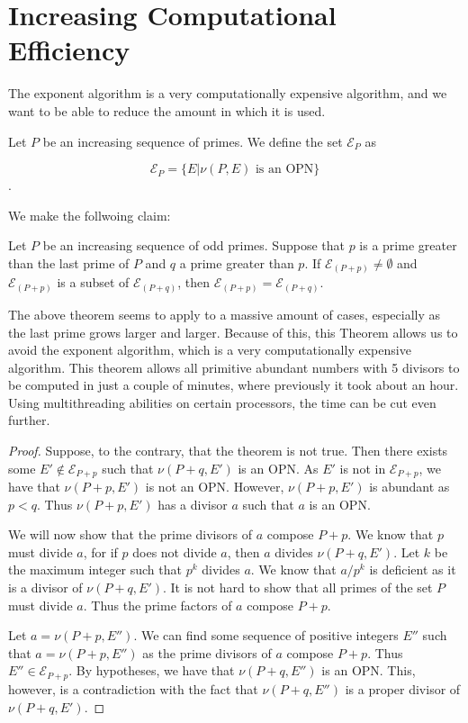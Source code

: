 \documentclass[../paper.tex]{subfiles}
\begin{document}
\section{Increasing Computational Efficiency}

The exponent algorithm is a very computationally expensive
algorithm, and we want to be able to reduce the amount in which it
is used. 

Let $P$ be an increasing sequence of primes. We define the set
$\mathcal{E}_P$ as 

$$\mathcal{E}_P = \{E | \nu(P, E) \text{ is an OPN}\}$$.

We make the follwoing claim:

\begin{theorem} 
Let $P$ be an increasing sequence of odd primes. Suppose
that $p$ is a prime greater than the last prime of $P$ and $q$ a
prime greater than $p$. If $\mathcal{E}_{(P + p)} \neq 
\emptyset$ and $\mathcal{E}_{(P + p)}$ is a subset of 
$\mathcal{E}_{(P + q)}$, then $\mathcal{E}_{(P + p)} = 
\mathcal{E}_{(P + q)}$.
\end{theorem}

The above theorem seems to apply to a massive amount of cases,
especially as the last prime grows larger and larger. Because of
this, this Theorem allows us to avoid the exponent algorithm,
which is a very computationally expensive algorithm. This theorem
allows all primitive abundant numbers with 5 divisors to be
computed in just a couple of minutes, where previously it took
about an hour. Using multithreading abilities on certain
processors, the time can be cut even further.


\begin{proof}
  Suppose, to the contrary, that the theorem is not true. Then
there exists some $E' \notin \mathcal{E}_{P + p}$ such that $\nu
(P + q, E')$ is an OPN. As $E'$ is not in $\mathcal{E}_{P + p}$,
we have that $\nu (P + p, E')$ is not an OPN. However, $\nu (P +
p, E')$ is abundant as $p < q$. Thus $\nu (P + p, E')$ has a
divisor $a$ such that $a$ is an OPN. 

  We will now show that the prime divisors of $a$ compose $P + p$.
We know that $p$ must divide $a$, for if $p$ does not divide $a$,
then $a$ divides $\nu (P + q, E')$. Let $k$ be the maximum
integer such that $p^k$ divides $a$. We know that $a / p^k$ is
deficient as it is a divisor of $\nu (P + q, E')$. It is not hard
to show that all primes of the set $P$ must divide $a$. Thus the
prime factors of $a$ compose $P + p$. 

  Let $a = \nu(P + p, E'')$. We can find some sequence of positive
integers $E''$ such that $a = \nu (P + p, E'')$ as the prime divisors
of $a$ compose $P + p$. Thus $E'' \in \mathcal{E}_{P + p}$. By
hypotheses, we have that $\nu(P + q, E'')$ is an OPN. This,
however, is a contradiction with the fact that $\nu(P + q, E'')$
is a proper divisor of $\nu(P + q, E')$.
\end{proof}
\end{document}
